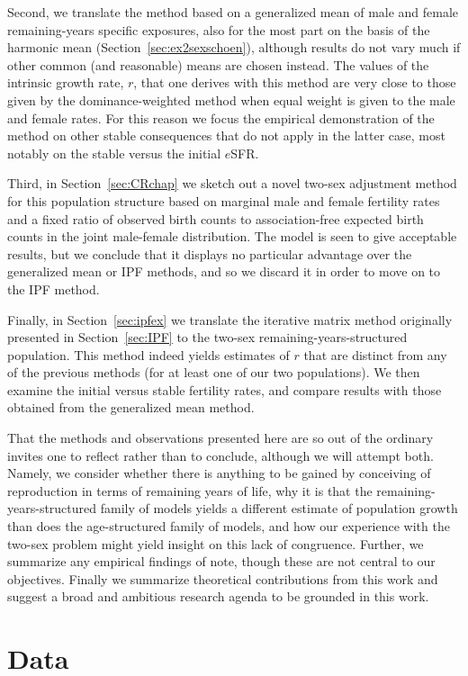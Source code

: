 Second, we translate the
method based on a generalized mean of male and female
remaining-years specific exposures, also for the most part on the basis of the
harmonic mean (Section~\ref{sec:ex2sexschoen}), although results do not vary
much if other common (and reasonable) means are chosen instead. The values of
the intrinsic growth rate, $r$, that one derives with this method are very close
to those given by the dominance-weighted method when equal weight is given to
the male and female rates. For this reason we focus the empirical
demonstration of the method on other stable consequences that do not apply in
the latter case, most notably on the stable versus the initial $e$SFR.

Third, in Section~\ref{sec:CRchap} we sketch out a novel two-sex adjustment
method for this population structure based on marginal male and female fertility
rates and a fixed ratio of observed birth counts to association-free expected
birth counts in the joint male-female distribution. The model is seen to give
acceptable results, but we conclude that it displays no particular advantage
over the generalized mean or IPF methods, and so we discard it in order to move
on to the IPF method.

Finally, in Section~\ref{sec:ipfex} we translate the iterative matrix method
originally presented in Section~\ref{sec:IPF} to the two-sex remaining-years-structured 
population. This method indeed yields estimates of $r$ that are distinct from
any of the previous methods (for at least one of our two populations). We then
examine the initial versus stable fertility rates, and compare results with
those obtained from the generalized mean method.

That the methods and observations presented here are so out of the ordinary
invites one to reflect rather than to conclude, although we will attempt both.
Namely, we consider whether there is anything to be gained by conceiving of
reproduction in terms of remaining years of life, why it is that the
remaining-years-structured family of models yields a different estimate of
population growth than does the age-structured family of models, and how our
experience with the two-sex problem might yield insight on this lack of
congruence. Further, we summarize any empirical findings of note, though these
are not central to our objectives. Finally we summarize theoretical
contributions from this work and suggest a broad and ambitious research agenda
to be grounded in this work.

\section{Data}

